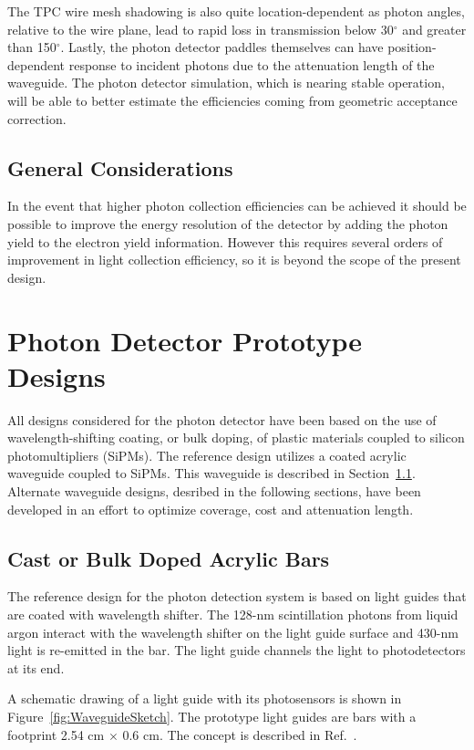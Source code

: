 The TPC wire mesh shadowing is also quite location-dependent as photon
angles, relative to the wire plane, lead to rapid loss in transmission
below 30$^{\circ}$ and greater than 150$^{\circ}$. Lastly, the photon
detector paddles themselves can have position-dependent response to
incident photons due to the attenuation length of the waveguide. The
photon detector simulation, which is nearing stable operation, will be
able to better estimate the efficiencies coming from geometric
acceptance correction.

\subsection{General Considerations}

In the event that higher photon collection efficiencies can be
achieved it should be possible to improve the energy resolution of the
detector by adding the photon yield to the electron yield information.
However this requires several orders of improvement in light
collection efficiency, so it is beyond the scope of the present design.

\section{Photon Detector Prototype Designs}

All designs considered for the photon detector have been based on the
use of wavelength-shifting coating, or bulk doping, of plastic
materials coupled to silicon photomultipliers (SiPMs). The reference
design utilizes a coated acrylic waveguide coupled to
SiPMs. This waveguide is described in Section~\ref{sec_bars}. Alternate waveguide designs, desribed in the following sections, have
been developed in an effort to optimize coverage, cost and attenuation length. 

\subsection{Cast or Bulk Doped Acrylic Bars}
\label{sec_bars}

The reference design for the photon detection system is based on light
guides that are coated with wavelength shifter. The 128-nm
scintillation photons from liquid argon interact with the wavelength
shifter on the light guide surface and 430-nm light is re-emitted in
the bar.  The light guide channels the light to photodetectors at its
end.

A schematic drawing of a light guide with its photosensors is shown in
Figure~\ref{fig:WaveguideSketch}. The prototype light guides are bars
with a footprint 2.54 cm $\times$ 0.6 cm.  The concept is described in
Ref.~\cite{bib:MITbars}.

